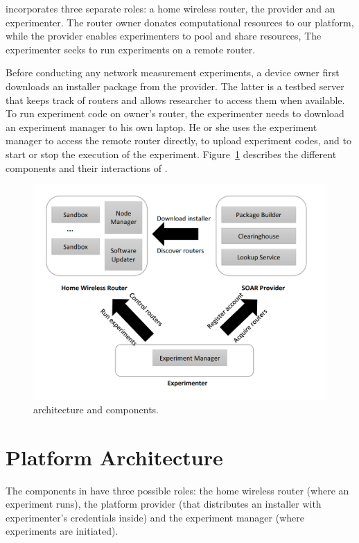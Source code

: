 \sysname incorporates three separate roles: a home wireless router, the \sysname provider and an experimenter. The router owner donates computational resources to our platform, while the \sysname provider enables experimenters to pool and share resources, The experimenter seeks to run experiments on a remote router.

Before conducting any network measurement experiments, a device owner first downloads an installer package from the \sysname provider. The latter is a testbed server that keeps track of routers and allows researcher to access them when available. To run experiment code on owner's router, the experimenter needs to download an experiment manager to his own laptop. He or she uses the experiment manager to access the remote router directly, to upload experiment codes, and to start or stop the execution of the experiment. Figure~\ref{fig-arch} describes the different components and their interactions of \sysname.

\begin{figure}%
\centering
\includegraphics[width=0.8\columnwidth]{figure/soar-arch.png}
\caption{\sysname architecture and components.}
\label{fig-arch}
\end{figure}

\section{Platform Architecture}
The components in \sysname have three possible roles: the home wireless router (where an experiment runs), the platform provider (that distributes an installer with experimenter's credentials inside) and the experiment manager (where experiments are initiated).

